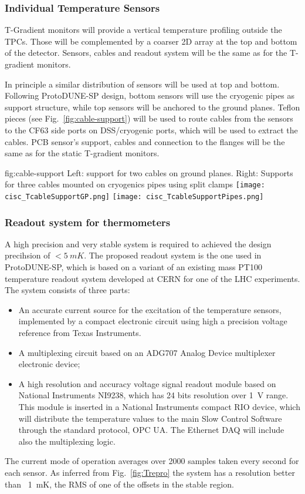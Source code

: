 \subsubsection{Individual Temperature Sensors}

T-Gradient monitors will provide a vertical temperature profiling outside the TPCs. Those will be complemented by a coarser 2D array at the top and bottom of the
detector. Sensors, cables and readout system will be the same as for the T-gradient monitors. 

In principle a similar distribution of sensors will be used at top and bottom.
Following ProtoDUNE-SP design, bottom sensors will use the cryogenic pipes as support structure, while top sensors will be anchored to the ground planes.
Teflon pieces (see Fig.~\ref{fig:cable-support}) will be used to route cables from the sensors to the CF63 side ports on DSS/cryogenic ports, which will be used to extract the cables.
PCB sensor's support, cables and connection to the flanges will be the same as for the static T-gradient monitors. 

\begin{dunefigure}{fig:cable-support}
  {Left: support for two cables on ground planes. Right: Supports for three cables  mounted on cryogenics pipes using split clamps}
  \texttt{[image: cisc\_TcableSupportGP.png]}
  \texttt{[image: cisc\_TcableSupportPipes.png]}
\end{dunefigure}


\subsubsection{Readout system for thermometers}
\label{sec:fdgen-slow-cryo-therm-readout}

A high precision and very stable system is required to achieved the design precihsion of $< \SI{5}{mK}$.
The proposed readout system is the one used in ProtoDUNE-SP, which is based on a variant of an existing mass PT100 temperature readout system developed at
CERN for one of the LHC experiments. The system consists of three parts:
\begin{itemize}
\item An accurate current source for the excitation of the temperature sensors, implemented by a compact electronic circuit using high a precision voltage reference from Texas Instruments. 
\item A multiplexing circuit based on an ADG707 Analog Device multiplexer electronic device;
\item A high resolution and accuracy voltage signal readout module based on National Instruments NI9238, which has 24 bits resolution over \SI{1}{V} range.
  This module is inserted in a National Instruments compact RIO device, which will distribute the temperature values to the main Slow Control Software
  through the standard protocol, OPC UA. The Ethernet DAQ will include also the multiplexing logic.
\end{itemize}


The current mode of operation averages over 2000 samples taken every second for each sensor. 
As inferred from Fig.~\ref{fig:Trepro} the system has a resolution better than \
\SI{1}{mK}, the RMS of one of the offsets in the stable region.

